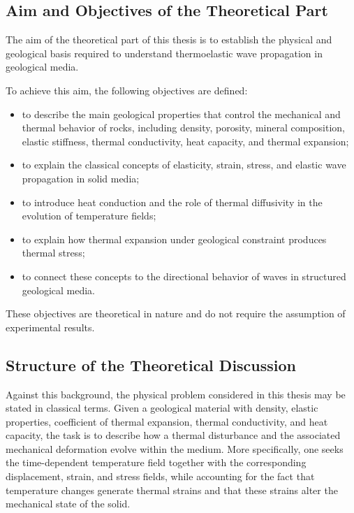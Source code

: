 \documentclass[12pt]{article}
\begin{document}
\subsection{Aim and Objectives of the Theoretical Part}

The aim of the theoretical part of this thesis is to establish the physical and geological basis required to understand thermoelastic wave propagation in geological media.

To achieve this aim, the following objectives are defined:

\begin{itemize}
    \item to describe the main geological properties that control the mechanical and thermal behavior of rocks, including density, porosity, mineral composition, elastic stiffness, thermal conductivity, heat capacity, and thermal expansion;

    \item to explain the classical concepts of elasticity, strain, stress, and elastic wave propagation in solid media;

    \item to introduce heat conduction and the role of thermal diffusivity in the evolution of temperature fields;

    \item to explain how thermal expansion under geological constraint produces thermal stress;

    \item to connect these concepts to the directional behavior of waves in structured geological media.
\end{itemize}

These objectives are theoretical in nature and do not require the assumption of experimental results.

\subsection{Structure of the Theoretical Discussion}

Against this background, the physical problem considered in this thesis may be stated in classical terms. Given a geological material with density, elastic properties, coefficient of thermal expansion, thermal conductivity, and heat capacity, the task is to describe how a thermal disturbance and the associated mechanical deformation evolve within the medium. More specifically, one seeks the time-dependent temperature field together with the corresponding displacement, strain, and stress fields, while accounting for the fact that temperature changes generate thermal strains and that these strains alter the mechanical state of the solid.
\end{document}
